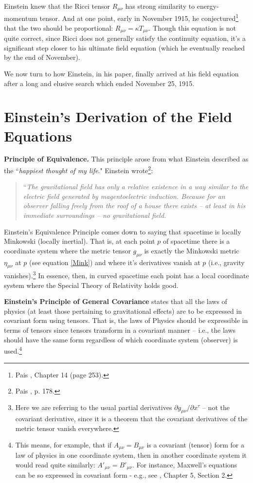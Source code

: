 \documentclass[12pt,reqno]{amsart}
\theoremstyle{definition}
\def\ccite#1{\textcolor{red}{\cite{#1}}}
\numberwithin{equation}{section}
\begin{document}
Einstein knew that the Ricci tensor $R_{\mu\nu}$ has strong similarity to energy-momentum tensor. And at one point, early in November 1915, he conjectured\footnote{Pais \ccite{Pais}, Chapter 14 (page 253).} that the two should be proportional: $R_{\mu\nu} = \kappa T_{\mu\nu}$. Though this equation is not quite correct, since Ricci does not generally satisfy the continuity equation, it's a significant step closer to his ultimate field equation (which he eventually reached by the end of November). 

We now turn to how Einstein, in his paper, finally arrived at his field equation after a long and elusive search which ended November 25, 1915.

\bigskip

{\section{ Einstein's Derivation of the Field Equations}}

{\bf Principle of Equivalence.} This principle arose from what Einstein described as the ``{\it happiest thought of my life}." Einstein wrote\footnote{Pais \ccite{Pais}, p. 178.}: 

\begin{quote}``{\it The gravitational field has only a relative existence in a way similar to the electric field generated by magentoelectric induction. Because for an observer falling freely from the roof of a house there exists -- at least in his immediate surroundings -- no gravitational field.}
\end{quote}

\noindent Einstein's Equivalence Principle comes down to saying that spacetime is locally Minkowski (locally inertial). That is, at each point $p$ of spacetime there is a coordinate system where the metric tensor $g_{\mu\nu}$ is exactly the Minkowski metric $\eta_{\mu\nu}$ at $p$ (see equation \eqref{Mink}) and where it's derivatives vanish at $p$ (i.e., gravity vanishes).\footnote{Here we are referring to the usual partial derivatives $\partial g_{\mu\nu}/\partial x^\tau$ -- not the covariant derivative, since it is a theorem that the covariant derivatives of the metric tensor vanish everywhere.} In essence, then, in curved spacetime each point has a local coordinate system where the Special Theory of Relativity holds good.

\medskip

{\bf Einstein's Principle of General Covariance} states that all the laws of physics (at least those pertaining to gravitational effects) are to be expressed in covariant form using tensors. That is, the laws of Physics should be expressible in terms of tensors since tensors transform in a covariant manner -- i.e., the laws should have the same form regardless of which coordinate system (observer) is used.\footnote{This means, for example, that if $A_{\mu\nu}=B_{\mu\nu}$ is a covariant (tensor) form for a law of physics in one coordinate system, then in another coordinate system it would read quite similarly: $A'_{\mu\nu}=B'_{\mu\nu}$. For instance, Maxwell's equations can be so expressed in covariant form - e.g., see \ccite{Weinberg2}, Chapter 5, Section 2.}
\end{document}
